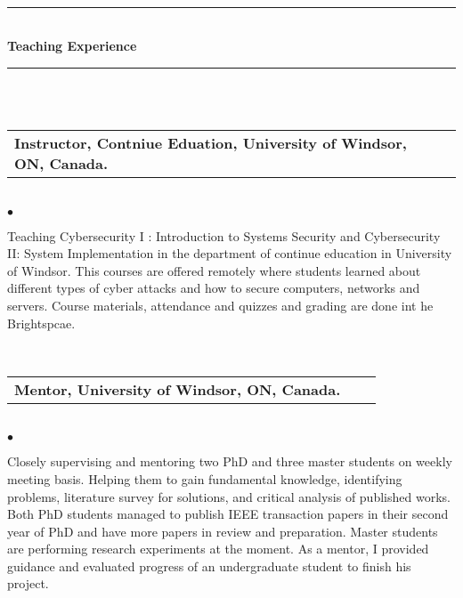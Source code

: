 \newpage 
 \thispagestyle{empty} 
 \phantom \quad \\
\hrule \phantom \quad  \vspace*{1\baselineskip}  \\
\bf  { Teaching Experience  }
 \vspace*{1\baselineskip}  \hrule \phantom \quad \\
\vspace*{3\baselineskip} \phantom \quad \\
 \mdseries \normalsize
\begin{tabular}{L{12cm}p{3cm}r} \bf  {  Instructor, Contniue Eduation, University of Windsor, ON, Canada.} &&\mdseries{}\mdseries  \normalsize \end{tabular}\\
\phantom \quad $\bullet$ \begin{minipage}[t]{0.965\textwidth}  
Teaching Cybersecurity I : Introduction to Systems Security and Cybersecurity II: System Implementation in the department of continue education in University of Windsor. This courses are offered remotely where students learned about different types of cyber attacks and how to secure  computers, networks and servers. Course materials, attendance and quizzes and grading are done int he Brightspcae. 
 \\[0.1cm]
 \end{minipage} \phantom  \mdseries \\ [0.2cm]
\begin{tabular}{L{12cm}p{3cm}r} \bf  {  Mentor, University of Windsor, ON, Canada.} &&\mdseries{}\mdseries  \normalsize \end{tabular}\\
\phantom \quad $\bullet$ \begin{minipage}[t]{0.965\textwidth}  
Closely supervising and mentoring two PhD and three master students on weekly meeting basis. Helping them to gain fundamental knowledge, identifying problems, literature survey for solutions, and critical analysis of published works. Both PhD students managed to publish IEEE transaction papers in their second year of PhD and have more papers in review and preparation. Master students are  performing research experiments at the moment. As a mentor, I provided guidance and evaluated progress of an undergraduate student to finish his project. \\[0.1cm]
 \end{minipage} \phantom  \mdseries \\ [0.2cm]
